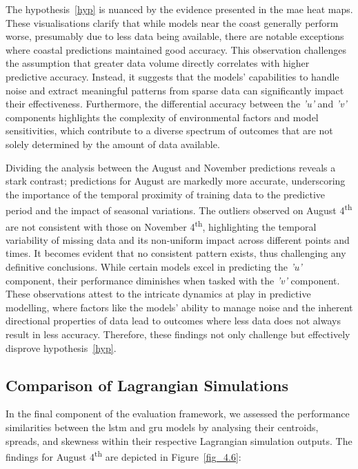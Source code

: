 The hypothesis~\ref{hyp} is nuanced by the evidence presented in the \acrshort{mae} heat maps. These visualisations clarify that while models near the coast generally perform worse, presumably due to less data being available, there are notable exceptions where coastal predictions maintained good accuracy. This observation challenges the assumption that greater data volume directly correlates with higher predictive accuracy. Instead, it suggests that the models' capabilities to handle noise and extract meaningful patterns from sparse data can significantly impact their effectiveness. Furthermore, the differential accuracy between the \textit{'u'} and \textit{'v'} components highlights the complexity of environmental factors and model sensitivities, which contribute to a diverse spectrum of outcomes that are not solely determined by the amount of data available.

Dividing the analysis between the August and November predictions reveals a stark contrast; predictions for August are markedly more accurate, underscoring the importance of the temporal proximity of training data to the predictive period and the impact of seasonal variations. The outliers observed on August 4\textsuperscript{th} are not consistent with those on November 4\textsuperscript{th}, highlighting the temporal variability of missing data and its non-uniform impact across different points and times. It becomes evident that no consistent pattern exists, thus challenging any definitive conclusions. While certain models excel in predicting the \textit{'u'} component, their performance diminishes when tasked with the \textit{'v'} component. These observations attest to the intricate dynamics at play in predictive modelling, where factors like the models' ability to manage noise and the inherent directional properties of data lead to outcomes where less data does not always result in less accuracy. Therefore, these findings not only challenge but effectively disprove hypothesis~\ref{hyp}.

\subsection{Comparison of Lagrangian Simulations}
\label{subsec:4.2.3}

In the final component of the evaluation framework, we assessed the performance similarities between the \acrshort{lstm} and \acrshort{gru} models by analysing their centroids, spreads, and skewness within their respective Lagrangian simulation outputs. The findings for August 4\textsuperscript{th} are depicted in Figure~\ref{fig_4.6}:

